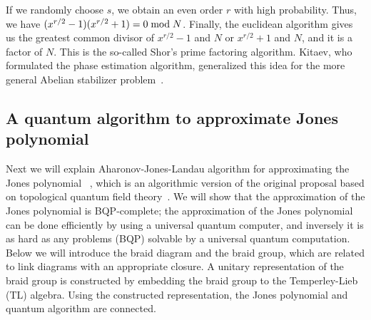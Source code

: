 If we randomly choose $s$, we obtain an even order $r$ with high probability.
Thus, we have $(x^{r/2}-1)(x^{r/2}+1)=0 \; {\rm mod} \; N$.
Finally, the euclidean algorithm gives us the greatest common divisor of $x^{r/2}-1$ and $N$ or $x^{r/2}+1$ and $N$, and it is a factor of $N$.
This is the so-called Shor's prime factoring algorithm.
Kitaev, who formulated the phase estimation algorithm, generalized this idea for the more general Abelian stabilizer problem~\cite{KitaevAbelian}.



\subsection{A quantum algorithm to approximate Jones polynomial}
\label{sec:JonesPoly}
Next we will explain Aharonov-Jones-Landau algorithm 
for approximating the Jones polynomial
~\cite{AharonovJones,AharonovJonesHard},
which is an algorithmic version of 
the original proposal based on topological quantum field theory~\cite{TQFT,Witten89}.
We will show that the approximation of the Jones polynomial 
is BQP-complete;
the approximation of the Jones polynomial
can be done efficiently by using a universal quantum computer,
and inversely it is as hard as any problems (BQP) solvable by 
a universal quantum computation.
Below we will introduce the braid diagram and the braid group,
which are related to link diagrams with an appropriate closure.
A unitary representation of the braid group 
is constructed by embedding the braid group to 
the Temperley-Lieb (TL) algebra.
Using the constructed representation,
the Jones polynomial and quantum algorithm are connected.

